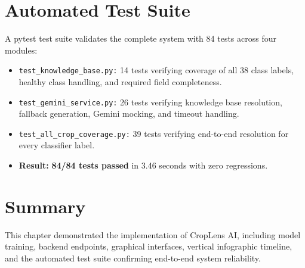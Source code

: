 \section{Automated Test Suite}

A pytest test suite validates the complete system with 84 tests across four modules:
\begin{itemize}
    \item \texttt{test\_knowledge\_base.py:} 14 tests verifying coverage of all 38 class labels, healthy class handling, and required field completeness.
    \item \texttt{test\_gemini\_service.py:} 26 tests verifying knowledge base resolution, fallback generation, Gemini mocking, and timeout handling.
    \item \texttt{test\_all\_crop\_coverage.py:} 39 tests verifying end-to-end resolution for every classifier label.
    \item \textbf{Result:} \textbf{84/84 tests passed} in 3.46 seconds with zero regressions.
\end{itemize}

\section{Summary}

This chapter demonstrated the implementation of CropLens AI, including model training, backend endpoints, graphical interfaces, vertical infographic timeline, and the automated test suite confirming end-to-end system reliability.
